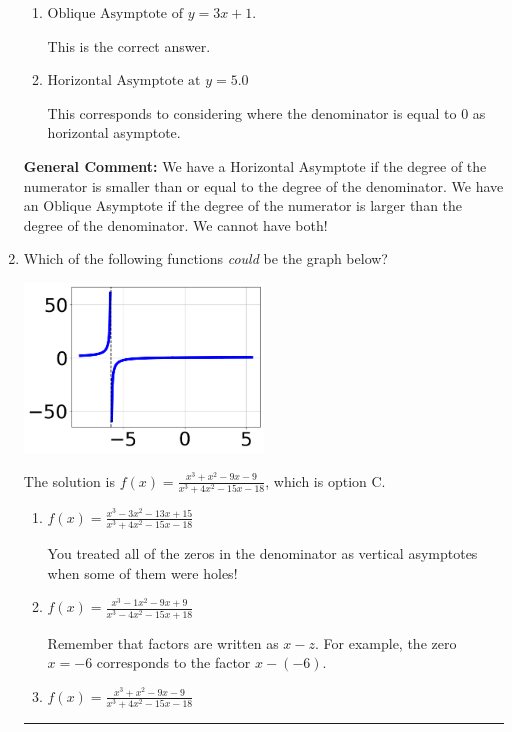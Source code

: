 \documentclass{extbook}[14pt]
\newcommand{\litem}[1]{\item #1

\rule{\textwidth}{0.4pt}}
\begin{document}
\begin{enumerate}
{\begin{enumerate}[label=\Alph*.]
This corresponds to believing there can be both a horizontal and oblique asymptote AND mixing up horizontal/vertical asymoptote.
\item \( \text{Oblique Asymptote of } y = 3x + 1. \)

This is the correct answer.
\item \( \text{Horizontal Asymptote at } y = 5.0 \)

This corresponds to considering where the denominator is equal to 0 as horizontal asymptote.
\end{enumerate}

\textbf{General Comment:} We have a Horizontal Asymptote if the degree of the numerator is smaller than or equal to the degree of the denominator. We have an Oblique Asymptote if the degree of the numerator is larger than the degree of the denominator. We cannot have both!
}
\litem{
Which of the following functions \textit{could} be the graph below?

\begin{center}
    \includegraphics[width=0.5\textwidth]{../Figures/identifyGraphOfRationalFunctionC.png}
\end{center}




The solution is \( f(x)=\frac{x^{3} + x^{2} -9 x -9}{x^{3} +4 x^{2} -15 x -18} \), which is option C.\begin{enumerate}[label=\Alph*.]
\item \( f(x)=\frac{x^{3} -3 x^{2} -13 x + 15}{x^{3} +4 x^{2} -15 x -18} \)

You treated all of the zeros in the denominator as vertical asymptotes when some of them were holes!
\item \( f(x)=\frac{x^{3} -1 x^{2} -9 x + 9}{x^{3} -4 x^{2} -15 x + 18} \)

Remember that factors are written as $x-z$. For example, the zero $x=-6$ corresponds to the factor $x-(-6)$.
\item \( f(x)=\frac{x^{3} + x^{2} -9 x -9}{x^{3} +4 x^{2} -15 x -18} \)


\end{enumerate}}
\end{enumerate}
\end{document}
